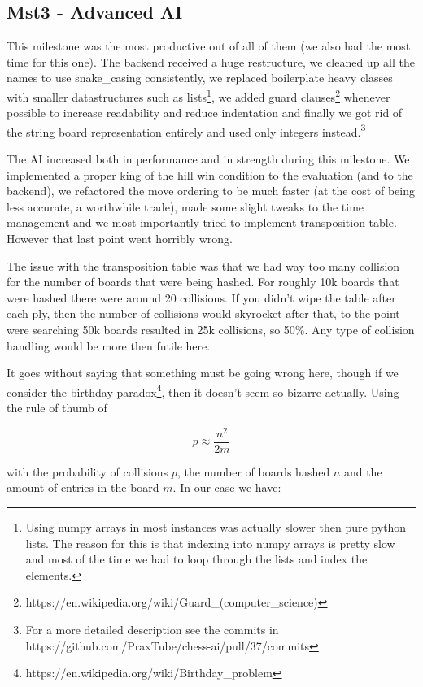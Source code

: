 \subsection{Mst3 - Advanced AI}

This milestone was the most productive out of all of them
(we also had the most time for this one).
The backend received a huge restructure, we cleaned up
all the names to use snake\_casing consistently, we
replaced boilerplate heavy classes with smaller
datastructures such as
lists\footnote{Using numpy arrays in most instances
was actually slower then pure python lists. The reason
for this is that indexing into numpy arrays is pretty
slow and most of the time we had to loop through
the lists and index the elements.}, we added
guard
clauses\footnote{https://en.wikipedia.org/wiki/Guard\_(computer\_science)}
whenever possible to increase readability and reduce
indentation and finally we got rid of the string
board representation entirely and used only integers
instead.\footnote{For a more detailed description see the commits in https://github.com/PraxTube/chess-ai/pull/37/commits}

The AI increased both in performance and in strength during
this milestone. We implemented a proper king of the hill
win condition to the evaluation (and to the backend),
we refactored the move ordering to be much faster
(at the cost of being less accurate, a worthwhile trade),
made some slight tweaks to the time management and we most
importantly tried to implement transposition table. However
that last point went horribly wrong.

The issue with the transposition table was that we had
way too many collision for the number of boards that were being hashed.
For roughly 10k boards that were hashed there were around 20 collisions.
If you didn't wipe the table after each ply,
then the number of collisions would skyrocket after that,
to the point were searching 50k boards resulted in 25k collisions,
so 50\%. Any type of collision handling would be more then futile here.

It goes without saying that something must be going wrong here,
though if we consider the birthday
paradox\footnote{https://en.wikipedia.org/wiki/Birthday\_problem},
then it doesn't seem so bizarre actually.
Using the rule of thumb of 

$$ p \approx \frac{n^2}{2m} $$

with the probability of collisions $p$,
the number of boards hashed $n$ and the amount of entries in the board $m$.
In our case we have:


